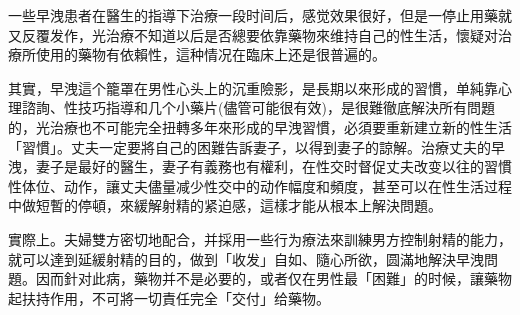 \documentclass[12pt,UTF8]{ctexbook}
\begin{document}
一些早洩患者在醫生的指導下治療一段时间后，感觉效果很好，但是一停止用藥就又反覆发作，光治療不知道以后是否總要依靠藥物來维持自己的性生活，懷疑对治療所使用的藥物有依賴性，這种情况在臨床上还是很普遍的。

其實，早洩這个籠罩在男性心头上的沉重險影，是長期以來形成的習慣，单純靠心理諮詢、性技巧指導和几个小藥片(儘管可能很有效)，是很難徹底解決所有問題的，光治療也不可能完全扭轉多年來形成的早洩習慣，必須要重新建立新的性生活「習慣」。丈夫一定要將自己的困難告訴妻子，以得到妻子的諒解。治療丈夫的早洩，妻子是最好的醫生，妻子有義務也有權利，在性交时督促丈夫改变以往的習慣性体位、动作，讓丈夫儘量减少性交中的动作幅度和頻度，甚至可以在性生活过程中做短暫的停頓，來緩解射精的紧迫感，這樣才能从根本上解決問題。

實際上。夫婦雙方密切地配合，并採用一些行为療法來訓練男方控制射精的能力，就可以達到延緩射精的目的，做到「收发」自如、隨心所欲，圆滿地解決早洩問題。因而針对此病，藥物并不是必要的，或者仅在男性最「困難」的时候，讓藥物起扶持作用，不可將一切責任完全「交付」给藥物。

\backmatter
\end{document}

